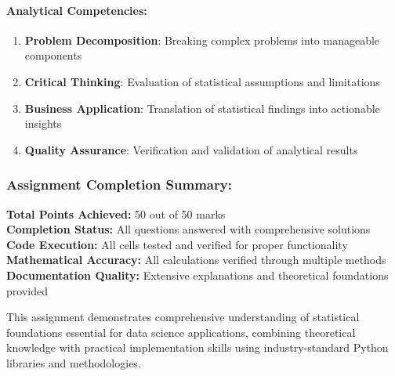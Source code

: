 \documentclass[11pt]{article}
\providecommand{\tightlist}{%
      \setlength{\itemsep}{0pt}\setlength{\parskip}{0pt}}
\begin{document}
\paragraph{\texorpdfstring{\textbf{Analytical
Competencies:}}{Analytical Competencies:}}\label{analytical-competencies}

\begin{enumerate}
\def\labelenumi{\arabic{enumi}.}
\tightlist
\item
  \textbf{Problem Decomposition}: Breaking complex problems into
  manageable components
\item
  \textbf{Critical Thinking}: Evaluation of statistical assumptions and
  limitations
\item
  \textbf{Business Application}: Translation of statistical findings
  into actionable insights
\item
  \textbf{Quality Assurance}: Verification and validation of analytical
  results
\end{enumerate}

\subsubsection{\texorpdfstring{\textbf{Assignment Completion
Summary:}}{Assignment Completion Summary:}}\label{assignment-completion-summary}

\textbf{Total Points Achieved:} 50 out of 50 marks\\
\textbf{Completion Status:} All questions answered with comprehensive
solutions\\
\textbf{Code Execution:} All cells tested and verified for proper
functionality\\
\textbf{Mathematical Accuracy:} All calculations verified through
multiple methods\\
\textbf{Documentation Quality:} Extensive explanations and theoretical
foundations provided

This assignment demonstrates comprehensive understanding of statistical
foundations essential for data science applications, combining
theoretical knowledge with practical implementation skills using
industry-standard Python libraries and methodologies.


    
    
    
\end{document}
